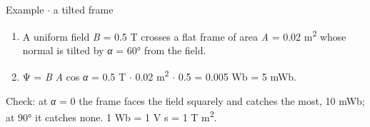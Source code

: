 \documentclass[11pt]{article}
\begin{document}
\begin{keepsection}
\begin{workedbox}{Example \ensuremath{\cdot} a tilted frame}
\begin{enumerate}
\item A uniform field \textit{B} = 0.5 T crosses a flat frame of area \textit{A} = 0.02 m\textsuperscript{2} whose normal is tilted by \textit{α} = 60° from the field.
\item Ψ = \textit{B} \textit{A} cos \textit{α} = 0.5 T \ensuremath{\cdot} 0.02 m\textsuperscript{2} \ensuremath{\cdot} 0.5 = 0.005 Wb = 5 mWb.
\end{enumerate}

Check: at \textit{α} = 0 the frame faces the field squarely and catches the most, 10 mWb; at 90° it catches none. 1 Wb = 1 V s = 1 T m\textsuperscript{2}.
\end{workedbox}
\end{keepsection}
\end{document}
